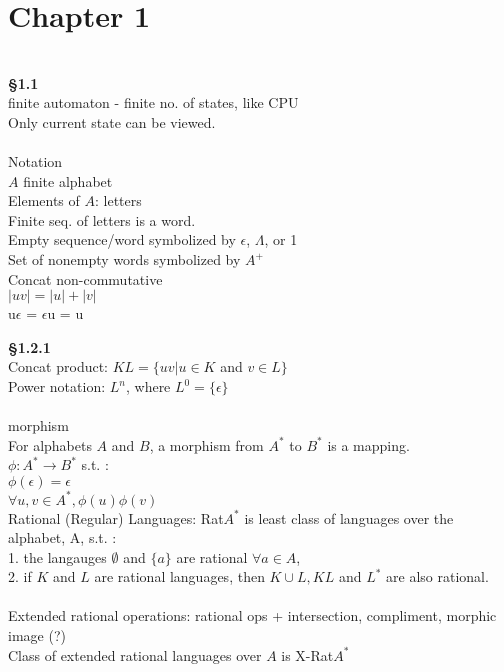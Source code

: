 \documentclass[12pt]{article}
\begin{document}
\tableofcontents

\newpage %

\section{Chapter 1}
\ \\
\textbf{\S{1.1}}\\
finite automaton - finite no. of states, like CPU\\
Only current state can be viewed.\\
\ \\
Notation\\
$A$ finite alphabet\\
Elements of $A$: letters\\
Finite seq. of letters is a word.\\
Empty sequence/word symbolized by $\epsilon$, $\Lambda$, or 1\\
Set of nonempty words symbolized by $A^{+}$\\
Concat non-commutative\\
$|uv| = |u| + |v|$\\
u$\epsilon$ = $\epsilon$u = u
\newpage %

\textbf{\S{1.2.1}}\\
Concat product: $KL = \{uv | u \in K$ and $v \in L\}$\\
Power notation: $L^{n}$, where $L^{0} = \{ \epsilon \}$\\
\ \\
morphism\\

For alphabets $A$ and $B$, a morphism from $A^{*}$ to $B^{*}$ is a mapping.\\ 
$\phi: A^{*} \to B^{*}$ s.t. :\\
$\phi(\epsilon) = \epsilon$\\
$\forall u,v \in A^{*}, \phi(u)\phi(v)$\\
Rational (Regular) Languages: Rat$A^{*}$ is least class of languages over the alphabet, A, s.t. :\\
1. the langauges $\emptyset$ and $\{ a \}$ are rational $\forall a \in A$,\\
2. if $K$ and $L$ are rational languages, then $K \cup L, KL$ and $L^{*}$ are also rational.\\
\ \\
Extended rational operations: rational ops + intersection, compliment, morphic image (?)\\
Class of extended rational languages over $A$ is X-Rat$A^{*}$  
\end{document}
